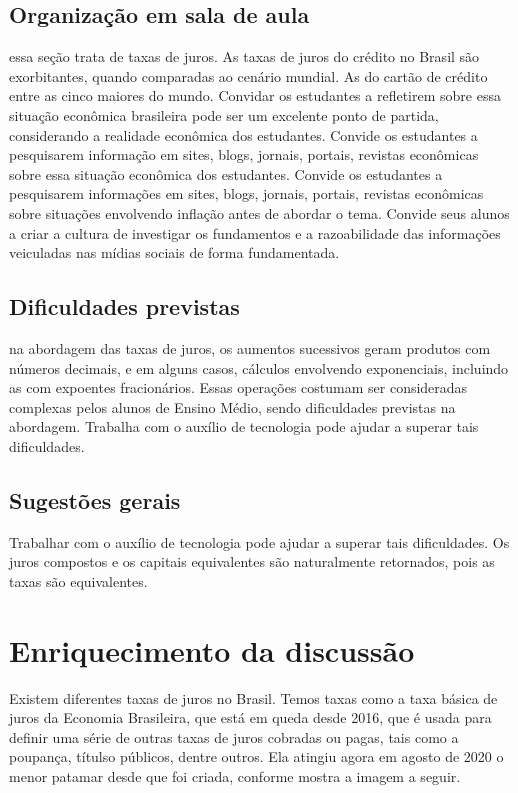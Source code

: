 \begin{paginatexto}
\subsection{Organização em sala de aula} essa seção trata de taxas de juros. As taxas de juros do crédito no Brasil são exorbitantes, quando comparadas ao cenário mundial. As do cartão de crédito entre as cinco maiores do mundo. Convidar os estudantes a refletirem sobre essa situação econômica brasileira pode ser um excelente ponto de partida, considerando a realidade econômica dos estudantes. Convide os estudantes a pesquisarem informação em sites, blogs, jornais, portais, revistas econômicas sobre essa situação econômica dos estudantes. Convide os estudantes a pesquisarem informações em sites, blogs, jornais, portais, revistas econômicas sobre situações envolvendo inflação antes de abordar o tema. Convide seus alunos a criar a cultura de investigar os fundamentos e a razoabilidade das informações veiculadas nas mídias sociais de forma fundamentada.

\subsection{Dificuldades previstas} na abordagem das taxas de juros, os aumentos sucessivos geram produtos com números decimais, e em alguns casos, cálculos envolvendo exponenciais, incluindo as com expoentes fracionários. Essas operações costumam ser consideradas complexas pelos alunos de Ensino Médio, sendo dificuldades previstas na abordagem. Trabalha com o auxílio de tecnologia pode ajudar a superar tais dificuldades.

\subsection{Sugestões gerais} Trabalhar com o auxílio de tecnologia pode ajudar a superar tais dificuldades. Os juros compostos e os capitais equivalentes são naturalmente retornados, pois as taxas são equivalentes.

\section*{Enriquecimento da discussão}

Existem diferentes taxas de juros no Brasil. Temos taxas como a taxa básica de juros da Economia Brasileira, que está em queda desde 2016, que é usada para definir uma série de outras taxas de juros cobradas ou pagas, tais como a poupança, títulso públicos, dentre outros. Ela atingiu agora em agosto de 2020 o menor patamar desde que foi criada, conforme mostra a imagem a seguir.


\end{paginatexto}
